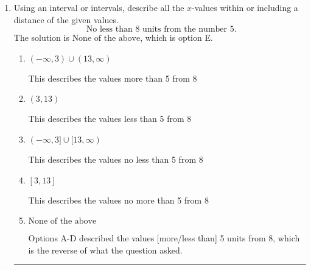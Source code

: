 \documentclass{extbook}[14pt]
\newcommand{\litem}[1]{\item #1

\rule{\textwidth}{0.4pt}}
\begin{document}
\begin{enumerate}
{\begin{enumerate}[label=\Alph*.]
 $(-\infty, -1.25]$, which corresponds to switching the direction of the interval. You likely did this if you did not flip the inequality when dividing by a negative!
\item \( (-\infty, a], \text{ where } a \in [0.8, 1.5] \)

 $(-\infty, 1.25]$, which corresponds to switching the direction of the interval AND negating the endpoint. You likely did this if you did not flip the inequality when dividing by a negative as well as not moving values over to a side properly.
\item \( [a, \infty), \text{ where } a \in [-4.25, -0.25] \)

* $[-1.25, \infty)$, which is the correct option.
\item \( [a, \infty), \text{ where } a \in [1.25, 10.25] \)

 $[1.25, \infty)$, which corresponds to negating the endpoint of the solution.
\item \( \text{None of the above}. \)

You may have chosen this if you thought the inequality did not match the ends of the intervals.
\end{enumerate}

\textbf{General Comment:} Remember that less/greater than or equal to includes the endpoint, while less/greater do not. Also, remember that you need to flip the inequality when you multiply or divide by a negative.
}
\litem{
Using an interval or intervals, describe all the $x$-values within or including a distance of the given values.
\[ \text{ No less than } 8 \text{ units from the number } 5. \]The solution is \( \text{None of the above} \), which is option E.\begin{enumerate}[label=\Alph*.]
\item \( (-\infty, 3) \cup (13, \infty) \)

This describes the values more than 5 from 8
\item \( (3, 13) \)

This describes the values less than 5 from 8
\item \( (-\infty, 3] \cup [13, \infty) \)

This describes the values no less than 5 from 8
\item \( [3, 13] \)

This describes the values no more than 5 from 8
\item \( \text{None of the above} \)

Options A-D described the values [more/less than] 5 units from 8, which is the reverse of what the question asked.
\end{enumerate}

}
\end{enumerate}
\end{document}

